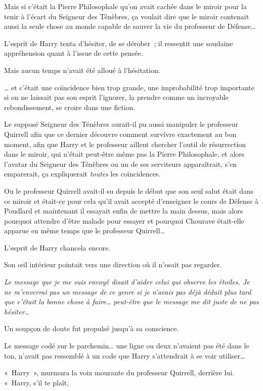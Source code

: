 Mais si c'était la Pierre Philosophale qu'on avait cachée dans le miroir pour la tenir à l'écart du Seigneur des Ténèbres, ça voulait dire que le miroir contenait aussi la seule chose au monde capable de sauver la vie du professeur de Défense…

L'esprit de Harry tenta d'hésiter, de se dérober~; il ressentit une soudaine appréhension quant à l'issue de cette pensée.

Mais aucun temps n'avait été alloué à l'hésitation.

… et c'était une coïncidence bien trop grande, une improbabilité trop importante si on ne laissait pas son esprit l'ignorer, la prendre comme un incroyable rebondissement, se croire dans une fiction.

Le supposé Seigneur des Ténèbres aurait-il pu aussi manipuler le professeur Quirrell afin que ce dernier découvre comment survivre exactement au bon moment, afin que Harry et le professeur aillent chercher l'outil de résurrection dans le miroir, qui n'était peut-être même pas la Pierre Philosophale, et alors l'avatar du Seigneur des Ténèbres ou un de ses serviteurs apparaîtrait, s'en emparerait, ça expliquerait \emph{toutes} les coïncidences.

Ou le professeur Quirrell avait-il su depuis le début que son seul salut était dans ce miroir et était-ce pour cela qu'il avait accepté d'enseigner le cours de Défense à Poudlard et maintenant il essayait enfin de mettre la main dessus, mais alors pourquoi attendre d'être malade pour essayer et pourquoi Chourave était-elle apparue en même temps que le professeur Quirrell…

L'esprit de Harry chancela encore.

Son œil intérieur pointait vers une direction où il n'osait pas regarder.

\emph{Le message que je me suis envoyé disait d'aider celui qui observe les étoiles. Je ne m'enverrai pas un message de ce genre si je n'avais pas déjà déduit plus tard que c'était la bonne chose à faire… peut-être que le message me dit juste de ne pas hésiter…}

Un soupçon de doute fut propulsé jusqu'à sa conscience.

Le message codé sur le parchemin… une ligne ou deux n'avaient pas été dans le ton, n'avait pas ressemblé à un code que Harry s'attendrait à se voir utiliser…

«~Harry~», murmura la voix mourante du professeur Quirrell, derrière lui. «~Harry, s'il te plaît,

